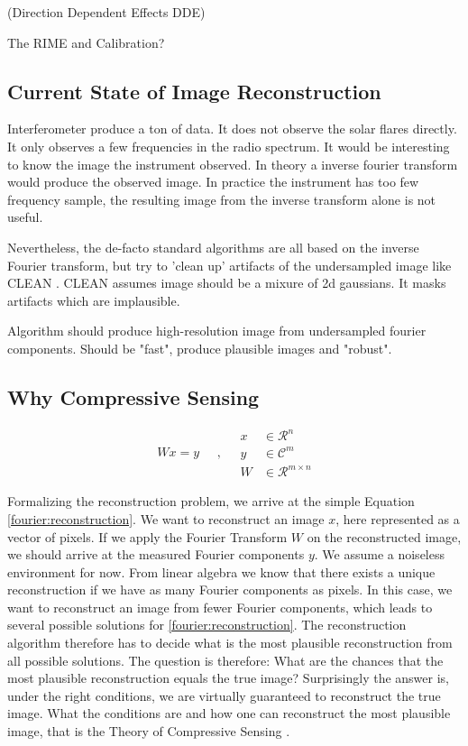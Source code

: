 (Direction Dependent Effects DDE)

The RIME and Calibration?


\subsection{Current State of Image Reconstruction}
Interferometer produce a ton of data. It does not observe the solar flares directly. It only observes a few frequencies in the radio spectrum. It would be interesting to know the image the instrument observed. In theory a inverse fourier transform would produce the observed image. In practice the instrument has too few frequency sample, the resulting image from the inverse transform alone is not useful.

Nevertheless, the de-facto standard algorithms are all based on the inverse Fourier transform, but try to 'clean up' artifacts of the undersampled image like CLEAN \cite{hogbom1974aperture}. CLEAN assumes image should be a mixure of 2d gaussians. It masks artifacts which are implausible.

Algorithm should produce high-resolution image from undersampled fourier components. Should be "fast", produce plausible images and "robust".

\subsection{Why Compressive Sensing}
\begin{equation}\label{fourier:reconstruction}
\begin{split}
Wx = y
\end{split}
\quad , \quad
\begin{split}
x &\in \mathcal{R}^n\\
y &\in \mathcal{C}^m\\
W &\in \mathcal{R}^{m \times n}
\end{split}
\end{equation}

Formalizing the reconstruction problem, we arrive at the simple Equation \eqref{fourier:reconstruction}. We want to reconstruct an image $x$, here represented as a vector of pixels. If we apply the Fourier Transform $W$ on the reconstructed image, we should arrive at the measured Fourier components $y$. We assume a noiseless environment for now. From linear algebra we know that there  exists a unique reconstruction if we have as many Fourier components as pixels. In this case, we want to reconstruct an image from fewer Fourier components, which leads to several possible solutions for \eqref{fourier:reconstruction}. The reconstruction algorithm therefore has to decide what is the most plausible reconstruction from all possible solutions. The question is therefore: What are the chances that the most plausible reconstruction equals the true image? Surprisingly the answer is, under the right conditions, we are virtually guaranteed to reconstruct the true image. What the conditions are and how one can reconstruct the most plausible image, that is the Theory of Compressive Sensing \cite{candes2006robust} \cite{donoho2006compressed}.

